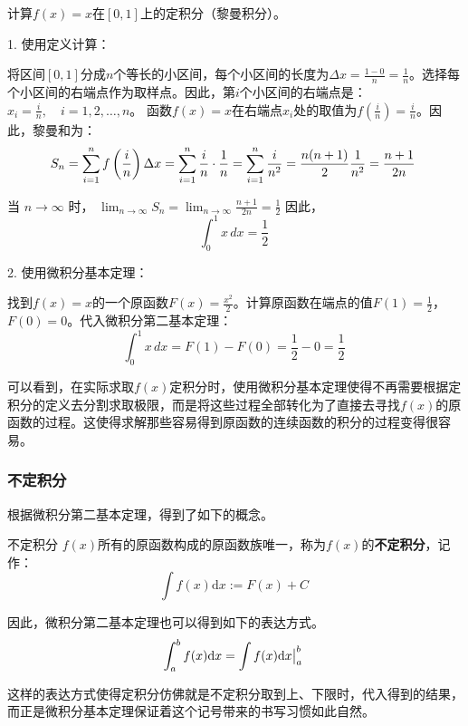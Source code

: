 \begin{example}{}
计算$f(x)=x$在$[0,1]$上的定积分（黎曼积分）。


1. 使用定义计算：

将区间$[0, 1]$分成$n$个等长的小区间，每个小区间的长度为$\Delta x = \frac{1 - 0}{n} = \frac{1}{n}$。选择每个小区间的右端点作为取样点。因此，第$i$个小区间的右端点是：$x_i = \frac{i}{n}, \quad i = 1, 2, \ldots, n$。
函数$f(x) = x$在右端点$x_i$处的取值为$f\left(\frac{i}{n} \right)=\frac{i}{n}$。因此，黎曼和为：
\begin{equation}
S_n = \sum_{i=1}^n f\left( \frac{i}{n} \right) \Delta x = \sum_{i=1}^n \frac{i}{n} \cdot \frac{1}{n} = \sum_{i=1}^n \frac{i}{n^2}=\frac{n(n+1)}{2}{1\over n^2} = \frac{n+1}{2n}~
\end{equation}

当 $ n \to \infty $ 时，
$\lim_{n \to \infty} S_n = \lim_{n \to \infty} \frac{n+1}{2n}= \frac{1}{2}$
因此，
\begin{equation}
\int_0^1 x \, dx = \frac{1}{2}~
\end{equation}


2. 使用微积分基本定理：

找到$f(x) = x$的一个原函数$F(x)=\frac{x^2}{2}$。计算原函数在端点的值$F(1) =\frac{1}{2}$，$F(0) = 0$。代入微积分第二基本定理：
\begin{equation}
\int_0^1 x \, dx = F(1) - F(0) = \frac{1}{2} - 0 = \frac{1}{2}~
\end{equation}

\end{example}
可以看到，在实际求取$f(x)$定积分时，使用微积分基本定理使得不再需要根据定积分的定义去分割求取极限，而是将这些过程全部转化为了直接去寻找$f(x)$的原函数的过程。这使得求解那些容易得到原函数的连续函数的积分的过程变得很容易。

\subsubsection{不定积分}

根据微积分第二基本定理，得到了如下的概念。

\begin{definition}{不定积分}
$f(x)$所有的原函数构成的原函数族唯一，称为$f(x)$的\textbf{不定积分}，记作：
\begin{equation}
\int f(x)\mathrm {d}x:=F(x)+C~
\end{equation}

\end{definition}

因此，微积分第二基本定理也可以得到如下的表达方式。
\begin{equation}
\int_{a}^{b} f(x)\mathrm {d}x=\int f(x)\mathrm {d}x\big{|}_{a}^{b}~
\end{equation}

这样的表达方式使得定积分仿佛就是不定积分取到上、下限时，代入得到的结果，而正是微积分基本定理保证着这个记号带来的书写习惯如此自然。